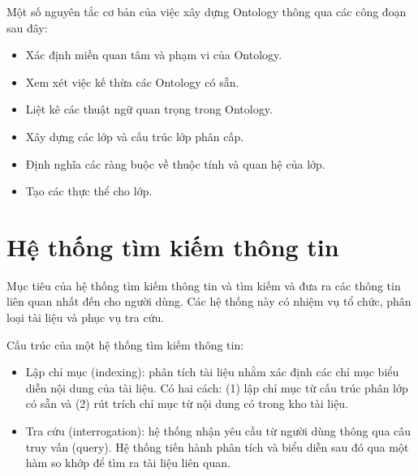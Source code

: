 Một số nguyên tắc cơ bản của việc xây dựng Ontology thông qua các công đoạn sau đây:

\begin{itemize}
    \item Xác định miền quan tâm và phạm vi của Ontology.
    \item Xem xét việc kế thừa các Ontology có sẵn.
    \item Liệt kê các thuật ngữ quan trọng trong Ontology.
    \item Xây dựng các lớp và cấu trúc lớp phân cấp.
    \item Định nghĩa các ràng buộc về thuộc tính và quan hệ của lớp.
    \item Tạo các thực thể cho lớp.
\end{itemize}



\section{Hệ thống tìm kiếm thông tin}

Mục tiêu của hệ thống tìm kiếm thông tin và tìm kiếm và đưa ra các thông tin liên quan nhất đến cho người dùng. Các hệ thống này có nhiệm vụ tổ chức, phân loại tài liệu và phục vụ tra cứu. 

Cấu trúc của một hệ thống tìm kiếm thông tin:
\begin{itemize}
    \item Lập chỉ mục (indexing): phân tích tài liệu nhằm xác định các chỉ mục biểu diễn nội dung của tài liệu. Có hai cách: (1) lập chỉ mục từ cấu trúc phân lớp có sẵn và (2) rút trích chỉ mục từ nội dung có trong kho tài liệu.
    \item Tra cứu (interrogation): hệ thống nhận yêu cầu từ người dùng thông qua câu truy vấn (query). Hệ thống tiến hành phân tích và biểu diễn sau đó qua một hàm so khớp để tìm ra tài liệu liên quan.
\end{itemize}
